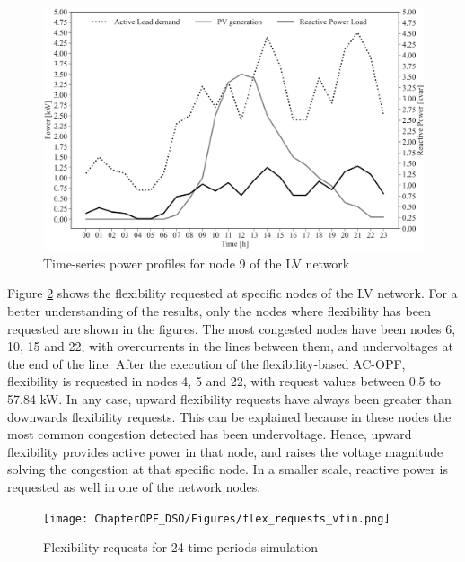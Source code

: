 \begin{figure}[H]
	\centering
	\includegraphics[width=0.8\columnwidth ]{ChapterOPF_DSO/Figures/p_q_profile_2.png}
		\caption{Time-series power profiles for node 9 of the LV network}
	\label{fig:data_opf_multiperiod}  
\end{figure}

Figure \ref{fig:flex_requests} shows the flexibility requested at specific nodes of the LV network. For a better understanding of the results, only the nodes where flexibility has been requested are shown in the figures. The most congested nodes have been nodes 6, 10, 15 and 22, with overcurrents in the lines between them, and undervoltages at the end of the line. After the execution of the flexibility-based AC-OPF, flexibility is requested in nodes 4, 5 and 22, with request values between 0.5 to 57.84 kW. In any case, upward flexibility requests have always been greater than downwards flexibility requests. This can be explained because in these nodes the most common congestion detected has been undervoltage. Hence, upward flexibility provides active power in that node, and raises the voltage magnitude solving the congestion at that specific node. In a smaller scale, reactive power is requested as well in one of the network nodes. 

\begin{figure}[htbp]
	\centering
	\texttt{[image: ChapterOPF\_DSO/Figures/flex\_requests\_vfin.png]}
	\caption{Flexibility requests for 24 time periods simulation}
	\label{fig:flex_requests}  
\end{figure}

